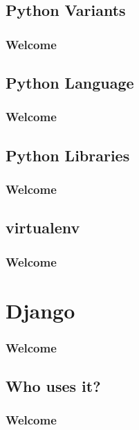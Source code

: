 \documentclass[12pt,presentation]{beamer}
\begin{document}
\subsection{Python Variants}

\begin{frame}
	\frametitle{Welcome}

\end{frame}

\subsection{Python Language}

\begin{frame}
	\frametitle{Welcome}

\end{frame}

\subsection{Python Libraries}

\begin{frame}
	\frametitle{Welcome}

\end{frame}

\subsection{virtualenv}

\begin{frame}
	\frametitle{Welcome}

\end{frame}

\section{Django}

\begin{frame}
	\frametitle{Welcome}

\end{frame}

\subsection{Who uses it?}

\begin{frame}
	\frametitle{Welcome}

\end{frame}
\end{document}
